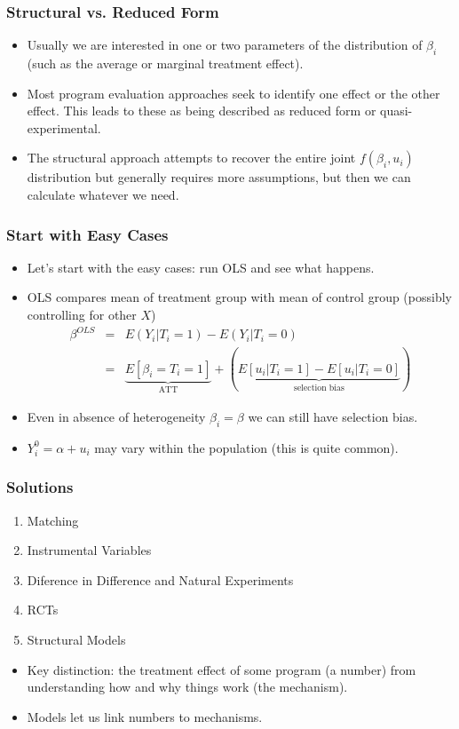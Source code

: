 \documentclass[xcolor=pdftex,dvipsnames,table,mathserif]{beamer}
\begin{document}
\begin{frame}
\frametitle{Structural vs. Reduced Form}
\begin{itemize}
\item Usually we are interested in one or two parameters of the distribution of $\beta_i$ (such as the average or marginal treatment effect).
\item Most program evaluation approaches seek to identify one effect or the other effect. This leads to these as being described as \alert{reduced form} or \alert{quasi-experimental}.
\item The \alert{structural} approach attempts to recover the entire joint $f(\beta_i,u_i)$ distribution but generally requires more assumptions, but then we can calculate whatever we need.
\end{itemize}
\end{frame}

\begin{frame}
\frametitle{Start with Easy Cases}
\begin{itemize}
\item Let's start with the easy cases: run OLS and see what happens.
\item OLS compares mean of treatment group with mean of control group (possibly controlling for other $X$)
\begin{eqnarray*}
\beta^{OLS} &=& E(Y_i | T_i =1) - E(Y_i | T_i=0) \\
&=& \underbrace{E[\beta_i = T_i =1]}_{\mbox{ATT}} + \left(\underbrace{E[u_i | T_i =1 ] - E[u_i | T_i=0] }_{\mbox{selection bias}}  \right)
\end{eqnarray*}
\item Even in absence of heterogeneity $\beta_i = \beta$ we can still have selection bias. 
\item $Y_i^0 = \alpha + u_i$ may vary within the population (this is quite common).
\end{itemize}
\end{frame}

\begin{frame}
\frametitle{Solutions}
\begin{enumerate}
\item Matching
\item Instrumental Variables
\item Diference in Difference and Natural Experiments
\item RCTs
\item Structural Models
\end{enumerate}
\begin{itemize}
\item Key distinction: the treatment effect of some program (a number) from understanding how and why things work (the mechanism).
\item Models let us link numbers to mechanisms.
\end{itemize}
\end{frame}
\end{document}
